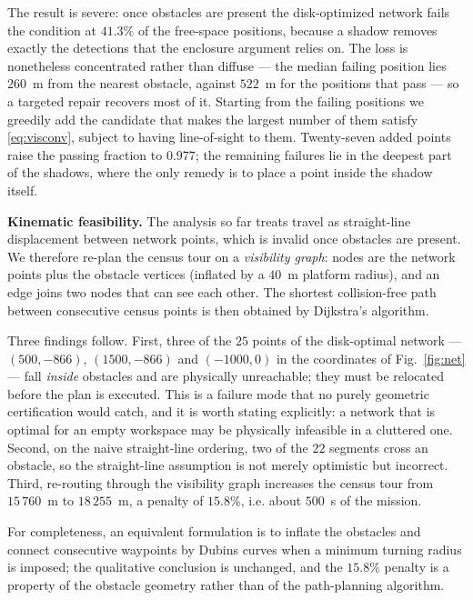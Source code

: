 \documentclass[journal,10pt]{IEEEtran}
\theoremstyle{definition}
\begin{document}
The result is severe: once obstacles are present the disk-optimized network fails the condition at
$41.3\%$ of the free-space positions, because a shadow removes exactly the detections that the
enclosure argument relies on. The loss is nonetheless concentrated rather than diffuse --- the
median failing position lies $260$~m from the nearest obstacle, against $522$~m for the positions
that pass --- so a targeted repair recovers most of it. Starting from the failing positions we
greedily add the candidate that makes the largest number of them satisfy \eqref{eq:visconv},
subject to having line-of-sight to them. Twenty-seven added points raise the passing fraction to
$0.977$; the remaining failures lie in the deepest part of the shadows, where the only remedy is to
place a point inside the shadow itself.

\noindent\textbf{Kinematic feasibility.} The analysis so far treats travel as straight-line
displacement between network points, which is invalid once obstacles are present. We therefore
re-plan the census tour on a \emph{visibility graph}: nodes are the network points plus the
obstacle vertices (inflated by a $40$~m platform radius), and an edge joins two nodes that can see
each other. The shortest collision-free path between consecutive census points is then obtained by
Dijkstra's algorithm.

Three findings follow. First, three of the $25$ points of the disk-optimal network ---
$(500,-866)$, $(1500,-866)$ and $(-1000,0)$ in the coordinates of Fig.~\ref{fig:net} --- fall
\emph{inside} obstacles and are physically unreachable; they must be relocated before the plan is
executed. This is a failure mode that no purely geometric certification would catch, and it is
worth stating explicitly: a network that is optimal for an empty workspace may be physically
infeasible in a cluttered one. Second, on the naive straight-line ordering, two of the $22$
segments cross an obstacle, so the straight-line assumption is not merely optimistic but
incorrect. Third, re-routing through the visibility graph increases the census tour from
$15\,760$~m to $18\,255$~m, a penalty of $15.8\%$, i.e. about $500$~s of the mission.

For completeness, an equivalent formulation is to inflate the obstacles and connect consecutive
waypoints by Dubins curves when a minimum turning radius is imposed; the qualitative conclusion is
unchanged, and the $15.8\%$ penalty is a property of the obstacle geometry rather than of the
path-planning algorithm.
\end{document}
